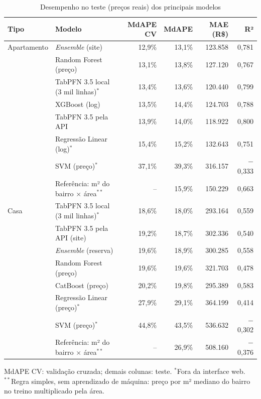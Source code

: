 \documentclass[
  article,
  a4paper,
  12pt,
  fleqn,
  oneside,
  chapter = TITLE,
  section = TITLE,
]{abntex2}
\begin{document}
\begin{table}[!htb]
  \caption{Desempenho no teste (preços reais) dos principais modelos}
  \label{tab:modelos}
  \centering
  \small
  \begin{tabular}{llrrrr}
    \hline
    \textbf{Tipo} & \textbf{Modelo} & \textbf{MdAPE CV} & \textbf{MdAPE} & \textbf{MAE (R\$)} & \textbf{R²} \\
    \hline
    Apartamento & \textit{Ensemble} (site) & 12,9\% & 13,1\% & 123.858 & 0,781 \\
    & Random Forest (preço) & 13,1\% & 13,8\% & 127.120 & 0,767 \\
    & TabPFN 3.5 local (3 mil linhas)$^{*}$ & 13,4\% & 13,6\% & 120.440 & 0,799 \\
    & XGBoost (log) & 13,5\% & 14,4\% & 124.703 & 0,788 \\
    & TabPFN 3.5 pela API & 13,9\% & 14,0\% & 118.922 & 0,800 \\
    & Regressão Linear (log)$^{*}$ & 15,4\% & 15,2\% & 132.643 & 0,751 \\
    & SVM (preço)$^{*}$ & 37,1\% & 39,3\% & 316.157 & $-$0,333 \\
    & Referência: m² do bairro × área$^{**}$ & -- & 15,9\% & 150.229 & 0,663 \\
    \hline
    Casa & TabPFN 3.5 local (3 mil linhas)$^{*}$ & 18,6\% & 18,0\% & 293.164 & 0,559 \\
    & TabPFN 3.5 pela API (site) & 19,2\% & 18,7\% & 302.336 & 0,540 \\
    & \textit{Ensemble} (reserva) & 19,6\% & 18,9\% & 300.285 & 0,558 \\
    & Random Forest (preço) & 19,6\% & 19,6\% & 321.703 & 0,478 \\
    & CatBoost (preço) & 20,2\% & 19,8\% & 295.389 & 0,583 \\
    & Regressão Linear (preço)$^{*}$ & 27,9\% & 29,1\% & 364.199 & 0,414 \\
    & SVM (preço)$^{*}$ & 44,8\% & 43,5\% & 536.632 & $-$0,302 \\
    & Referência: m² do bairro × área$^{**}$ & -- & 26,9\% & 508.160 & $-$0,376 \\
    \hline
  \end{tabular}

  \footnotesize{MdAPE CV: validação cruzada; demais colunas: teste. $^{*}$Fora da interface web.\\$^{**}$Regra simples, sem aprendizado de máquina: preço por m² mediano do bairro no treino multiplicado pela área.}
\end{table}
\end{document}
